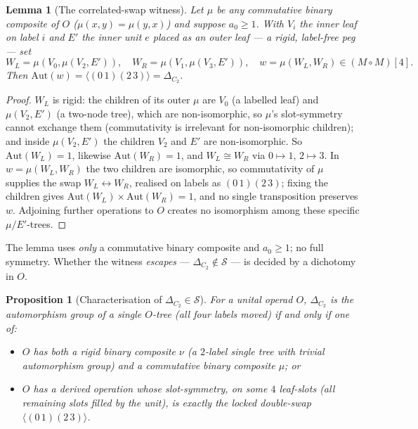 \documentclass[11pt]{amsart}
\theoremstyle{plain}
\newtheorem{proposition}[theorem]{Proposition}
\newtheorem{lemma}[theorem]{Lemma}
\theoremstyle{definition}
\begin{document}
\begin{lemma}[The correlated-swap witness]\label{lem:witness}
Let $\mu$ be any \emph{commutative} binary composite of $O$ \textup{(}$\mu(x,y)=\mu(y,x)$\textup{)} and
suppose $a_0\ge1$. With $V_i$ the inner leaf on label $i$ and $E'$ the inner unit $e$ placed as an
\emph{outer} leaf --- a rigid, label-free peg --- set
\[
  W_L=\mu(V_0,\mu(V_2,E')),\quad W_R=\mu(V_1,\mu(V_3,E')),\quad w=\mu(W_L,W_R)\in(M\circ M)[4].
\]
Then $\mathrm{Aut}(w)=\langle(0\,1)(2\,3)\rangle=\Delta_{C_2}$.
\end{lemma}

\begin{proof}
$W_L$ is rigid: the children of its outer $\mu$ are $V_0$ (a labelled leaf) and $\mu(V_2,E')$ (a two-node
tree), which are non-isomorphic, so $\mu$'s slot-symmetry cannot exchange them (commutativity is
irrelevant for non-isomorphic children); and inside $\mu(V_2,E')$ the children $V_2$ and $E'$ are
non-isomorphic. So $\mathrm{Aut}(W_L)=1$, likewise $\mathrm{Aut}(W_R)=1$, and $W_L\cong W_R$ via
$0\mapsto1,\,2\mapsto3$. In $w=\mu(W_L,W_R)$ the two children are isomorphic, so commutativity of $\mu$
supplies the swap $W_L\leftrightarrow W_R$, realised on labels as $(0\,1)(2\,3)$; fixing the children
gives $\mathrm{Aut}(W_L)\times\mathrm{Aut}(W_R)=1$, and no single transposition preserves $w$. Adjoining
further operations to $O$ creates no isomorphism among these specific $\mu/E'$-trees.
\end{proof}

The lemma uses \emph{only} a commutative binary composite and $a_0\ge1$; no full symmetry. Whether the
witness \emph{escapes} --- $\Delta_{C_2}\notin\mathcal S$ --- is decided by a dichotomy in $O$.

\begin{proposition}[Characterisation of $\Delta_{C_2}\in\mathcal S$]\label{prop:charac}
For a unital operad $O$, $\Delta_{C_2}$ is the automorphism group of a single $O$-tree \textup{(}all four
labels moved\textup{)} if and only if one of:
\begin{itemize}
\item[\textup{(M1)}] $O$ has \emph{both} a rigid binary composite $\nu$ \textup{(}a $2$-label single tree
  with trivial automorphism group\textup{)} \emph{and} a commutative binary composite $\mu$; or
\item[\textup{(M2)}] $O$ has a derived operation whose slot-symmetry, on some $4$ leaf-slots \textup{(}all
  remaining slots filled by the unit\textup{)}, is exactly the locked double-swap
  $\langle(0\,1)(2\,3)\rangle$.
\end{itemize}
\end{proposition}
\end{document}
